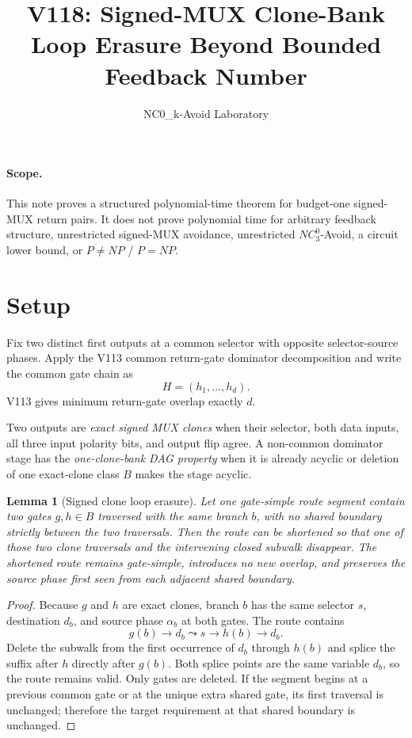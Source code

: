 \documentclass[11pt]{article}
\title{V118: Signed-MUX Clone-Bank Loop Erasure Beyond Bounded Feedback Number}
\author{NC0\_k-Avoid Laboratory}
\date{}
\newtheorem{lemma}{Lemma}
\begin{document}
\maketitle

\paragraph{Scope.}
This note proves a structured polynomial-time theorem for budget-one signed-MUX return pairs. It does not prove polynomial time for arbitrary feedback structure, unrestricted signed-MUX avoidance, unrestricted $NC^0_3$-Avoid, a circuit lower bound, or $P\neq NP$ / $P=NP$.

\section{Setup}
Fix two distinct first outputs at a common selector with opposite selector-source phases. Apply the V113 common return-gate dominator decomposition and write the common gate chain as
\[
H=(h_1,\ldots,h_d).
\]
V113 gives minimum return-gate overlap exactly $d$.

Two outputs are \emph{exact signed MUX clones} when their selector, both data inputs, all three input polarity bits, and output flip agree. A non-common dominator stage has the \emph{one-clone-bank DAG property} when it is already acyclic or deletion of one exact-clone class $B$ makes the stage acyclic.

\begin{lemma}[Signed clone loop erasure]
Let one gate-simple route segment contain two gates $g,h\in B$ traversed with the same branch $b$, with no shared boundary strictly between the two traversals. Then the route can be shortened so that one of those two clone traversals and the intervening closed subwalk disappear. The shortened route remains gate-simple, introduces no new overlap, and preserves the source phase first seen from each adjacent shared boundary.
\end{lemma}
\begin{proof}
Because $g$ and $h$ are exact clones, branch $b$ has the same selector $s$, destination $d_b$, and source phase $\alpha_b$ at both gates. The route contains
\[
g(b)\to d_b\leadsto s\to h(b)\to d_b.
\]
Delete the subwalk from the first occurrence of $d_b$ through $h(b)$ and splice the suffix after $h$ directly after $g(b)$. Both splice points are the same variable $d_b$, so the route remains valid. Only gates are deleted. If the segment begins at a previous common gate or at the unique extra shared gate, its first traversal is unchanged; therefore the target requirement at that shared boundary is unchanged.
\end{proof}
\end{document}
